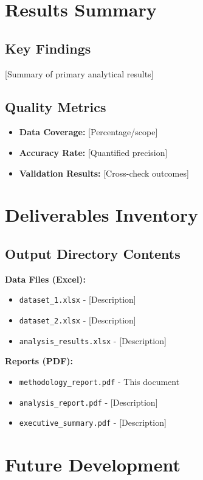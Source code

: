 \documentclass[11pt,letterpaper]{article}
\begin{document}
\section{Results Summary}

\subsection{Key Findings}
[Summary of primary analytical results]

\subsection{Quality Metrics}
\begin{itemize}
    \item \textbf{Data Coverage:} [Percentage/scope]
    \item \textbf{Accuracy Rate:} [Quantified precision]
    \item \textbf{Validation Results:} [Cross-check outcomes]
\end{itemize}

\section{Deliverables Inventory}

\subsection{Output Directory Contents}
\textbf{Data Files (Excel):}
\begin{itemize}
    \item \texttt{dataset\_1.xlsx} - [Description]
    \item \texttt{dataset\_2.xlsx} - [Description]
    \item \texttt{analysis\_results.xlsx} - [Description]
\end{itemize}

\textbf{Reports (PDF):}
\begin{itemize}
    \item \texttt{methodology\_report.pdf} - This document
    \item \texttt{analysis\_report.pdf} - [Description]
    \item \texttt{executive\_summary.pdf} - [Description]
\end{itemize}

\section{Future Development}
\end{document}
